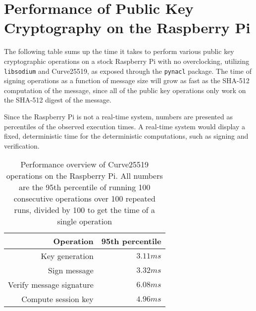 \chapter{Performance of Public Key Cryptography on the Raspberry Pi}\label{chp:public-key-raspberry-pi}

The following table sums up the time it takes to perform various public key cryptographic operations on a stock Raspberry Pi with no overclocking, utilizing \texttt{libsodium} and Curve25519, as exposed through the \texttt{pynacl} package. The time of signing operations as a function of message size will grow as fast as the SHA-512 computation of the message, since all of the public key operations only work on the SHA-512 digest of the message.

Since the Raspberry Pi is not a real-time system, numbers are presented as percentiles of the observed execution times. A real-time system would display a fixed, deterministic time for the deterministic computations, such as signing and verification.

\begin{table}[H]
\caption{Performance overview of Curve25519 operations on the Raspberry Pi. All numbers are the 95th percentile of running 100 consecutive operations over 100 repeated runs, divided by 100 to get the time of a single operation}\label{tab:public-key-crypto}
\centering
    \begin{tabular}{| r | r |}
    \hline
    \textbf{Operation} & \textbf{95th percentile} \\ \hline
    Key generation & \( 3.11 ms \) \\ \hline
    Sign message & \( 3.32 ms \) \\ \hline
    Verify message signature & \( 6.08 ms \) \\ \hline
    Compute session key & \( 4.96 ms \) \\ \hline
    \end{tabular}
\end{table}
